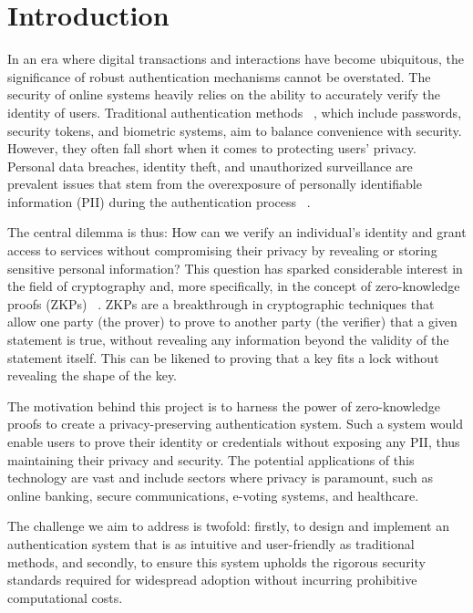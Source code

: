 \section{Introduction}
\label{sec:intro}

In an era where digital transactions and interactions have become ubiquitous, the significance of robust authentication mechanisms cannot be overstated. The security of online systems heavily relies on the ability to accurately verify the identity of users. Traditional authentication methods ~\cite{idrus2013reviewauth}, which include passwords, security tokens, and biometric systems, aim to balance convenience with security. However, they often fall short when it comes to protecting users' privacy. Personal data breaches, identity theft, and unauthorized surveillance are prevalent issues that stem from the overexposure of personally identifiable information (PII) during the authentication process ~\cite{wang2021authattacks}.

The central dilemma is thus: How can we verify an individual's identity and grant access to services without compromising their privacy by revealing or storing sensitive personal information? This question has sparked considerable interest in the field of cryptography and, more specifically, in the concept of zero-knowledge proofs (ZKPs) ~\cite{goldwasser1989zkp}. ZKPs are a breakthrough in cryptographic techniques that allow one party (the prover) to prove to another party (the verifier) that a given statement is true, without revealing any information beyond the validity of the statement itself. This can be likened to proving that a key fits a lock without revealing the shape of the key.

The motivation behind this project is to harness the power of zero-knowledge proofs to create a privacy-preserving authentication system. Such a system would enable users to prove their identity or credentials without exposing any PII, thus maintaining their privacy and security. The potential applications of this technology are vast and include sectors where privacy is paramount, such as online banking, secure communications, e-voting systems, and healthcare.

The challenge we aim to address is twofold: firstly, to design and implement an authentication system that is as intuitive and user-friendly as traditional methods, and secondly, to ensure this system upholds the rigorous security standards required for widespread adoption without incurring prohibitive computational costs.

